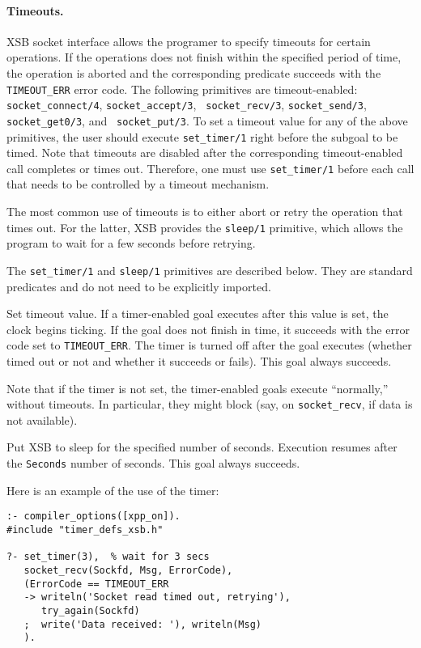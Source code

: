 \paragraph{Timeouts.}
XSB socket interface allows the programer to specify timeouts for certain
operations. If the operations does not finish within the specified period
of time, the operation is aborted and the corresponding predicate succeeds
with the {\tt TIMEOUT\_ERR} error code. The following primitives are
timeout-enabled: {\tt socket\_connect/4}, {\tt socket\_accept/3}, {\tt
  socket\_recv/3}, {\tt socket\_send/3}, {\tt socket\_get0/3}, and {\tt
  socket\_put/3}.  To set a timeout value for any of the above primitives,
the user should execute {\tt set\_timer/1} right before the subgoal to be
timed. Note that timeouts are disabled after the corresponding timeout-enabled
call completes or times out. Therefore, one must use {\tt set\_timer/1}
before each call that needs to be controlled by a timeout mechanism.

The most common use of timeouts is to either abort or retry the operation
that times out. For the latter, XSB provides the {\tt sleep/1} primitive,
which allows the program to wait for a few seconds before retrying.

The {\tt set\_timer/1} and {\tt sleep/1} primitives are described below.
They are standard predicates and do not need to be explicitly imported.
\begin{description}
Set timeout value. If a timer-enabled goal executes after this value is
set, the clock begins ticking. If the goal does not finish in time, it
succeeds with the error code set to {\tt TIMEOUT\_ERR}. The timer is turned
off after the goal executes (whether timed out or not and whether it
succeeds or fails). This goal always succeeds.

Note that if the timer is not set, the timer-enabled goals execute
``normally,'' without timeouts. In particular, they might block (say, on
{\tt socket\_recv}, if data is not available).

Put XSB to sleep for the specified number of seconds. Execution resumes
after the {\tt Seconds} number of seconds. This goal always succeeds.
\end{description}
Here is an example of the use of the timer:
\begin{samepage}
\begin{verbatim}
:- compiler_options([xpp_on]).
#include "timer_defs_xsb.h"

?- set_timer(3),  % wait for 3 secs
   socket_recv(Sockfd, Msg, ErrorCode),
   (ErrorCode == TIMEOUT_ERR
   -> writeln('Socket read timed out, retrying'),
      try_again(Sockfd)
   ;  write('Data received: '), writeln(Msg)
   ).
\end{verbatim}
\end{samepage}

